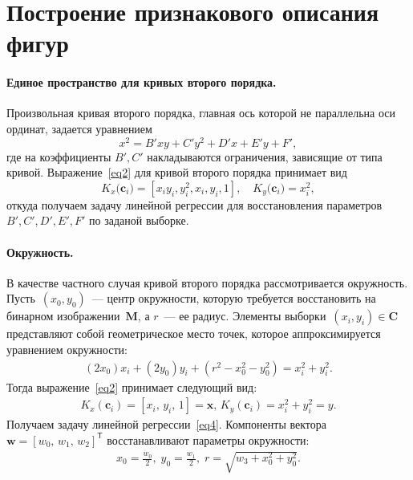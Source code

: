 \documentclass[12pt]{a&t}
\begin{document}
\section{Построение признакового описания фигур}
\paragraph{Единое пространство для кривых второго порядка.} Произвольная кривая второго порядка, главная ось которой не параллельна оси ординат, задается  уравнением
\[
\label{st:coef}
x^2 = B'xy+C'y^2+D'x+E'y+F',
\]
где на коэффициенты $B', C'$ накладываются ограничения, зависящие от типа кривой. Выражение~\eqref{eq2} для кривой второго порядка принимает вид
\[
\label{st:K_map}
K_x\bigr(\mathbf{c}_i\bigr)=\left[x_iy_i, y_i^2, x_i, y_i, 1\right], \quad K_y\bigr(\mathbf{c}_i\bigr)=x_i^2,
\]
откуда получаем задачу линейной регрессии для восстановления параметров ~$B', C', D', E', F'$ по заданой выборке.

\paragraph{Окружность.} В качестве частного случая кривой второго порядка рассмотривается окружность.
Пусть~$(x_0, y_0)$~--- центр окружности, которую требуется восстановить на бинарном изображении~$\mathbf{M}$, а $r$~--- ее радиус.
Элементы выборки~$(x_i, y_i) \in \mathbf{C}$ представляют собой геометрическое место точек, которое аппроксимируется уравнением окружности:
\begin{gather}(2x_0) x_i + (2y_0) y_i + (r^2 - x_0^2 - y_0^2) = x_i^2 + y_i^2. 
\end{gather}
Тогда выражение~\eqref{eq2} принимает следующий вид:
\begin{gather}
\label{10}
K_{x}(\mathbf{c}_i) = [x_i, \, y_i, \, 1] = \mathbf{x}, \,  K_{y}(\mathbf{c}_i) = x_i^2+y_i^2 = y.
\end{gather} 
Получаем задачу линейной регрессии~\eqref{eq4}.
Компоненты вектора~$\mathbf{w} = [w_0, \, w_1, \, w_2]^\mathsf{T}$ восстанавливают параметры окружности:
\begin{gather}
x_0 = \frac{w_0}{2}, \; y_0 = \frac{w_1}{2}, \; r = \sqrt{w_3 + x_0^2 + y_0 ^2}.
\end{gather}
\end{document}
